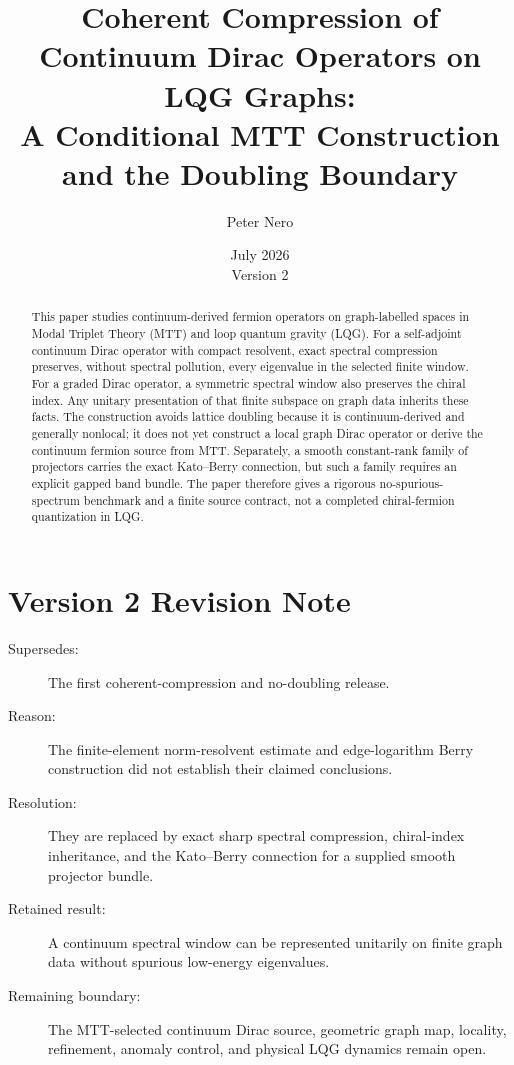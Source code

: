 \documentclass[11pt]{article}
\title{Coherent Compression of Continuum Dirac Operators on LQG Graphs:\\
\large A Conditional MTT Construction and the Doubling Boundary}
\author{Peter Nero}
\date{July 2026\\Version 2}
\begin{document}
\maketitle

\begin{abstract}
This paper studies continuum-derived fermion operators on graph-labelled
spaces in Modal Triplet Theory (MTT) and loop quantum gravity (LQG). For a
self-adjoint continuum Dirac operator with compact
resolvent, exact spectral compression preserves, without spectral pollution,
every eigenvalue in the selected finite window. For a graded Dirac operator,
a symmetric spectral window also preserves the chiral index. Any unitary
presentation of that finite subspace on graph data inherits these facts.
The construction avoids lattice doubling because it is continuum-derived and
generally nonlocal; it does not yet construct a local graph Dirac operator or
derive the continuum fermion source from MTT. Separately, a smooth
constant-rank family of projectors carries the exact Kato--Berry connection,
but such a family requires an explicit gapped band bundle. The paper therefore
gives a rigorous no-spurious-spectrum benchmark and a finite source contract,
not a completed chiral-fermion quantization in LQG.
\end{abstract}

\section*{Version 2 Revision Note}
\begin{description}
\item[Supersedes:] The first coherent-compression and no-doubling release.
\item[Reason:] The finite-element norm-resolvent estimate and edge-logarithm
Berry construction did not establish their claimed conclusions.
\item[Resolution:] They are replaced by exact sharp spectral compression,
chiral-index inheritance, and the Kato--Berry connection for a supplied
smooth projector bundle.
\item[Retained result:] A continuum spectral window can be represented
unitarily on finite graph data without spurious low-energy eigenvalues.
\item[Remaining boundary:] The MTT-selected continuum Dirac source, geometric
graph map, locality, refinement, anomaly control, and physical LQG dynamics
remain open.
\end{description}
\end{document}
